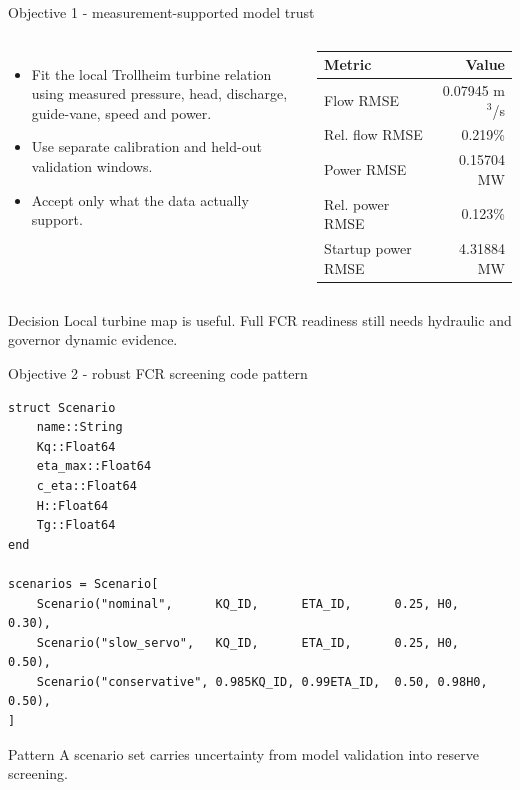 \documentclass[aspectratio=169,11pt]{beamer}
\begin{document}
\begin{frame}{Objective 1 - measurement-supported model trust}
\begin{columns}[T]
\begin{itemize}
\item Fit the local Trollheim turbine relation using measured pressure, head, discharge, guide-vane, speed and power.
\item Use separate calibration and held-out validation windows.
\item Accept only what the data actually support.
\end{itemize}
\begin{table}
\small
\begin{tabular}{lr}
\toprule
Metric & Value\\
\midrule
Flow RMSE & 0.07945 m$^3$/s\\
Rel. flow RMSE & 0.219\%\\
Power RMSE & 0.15704 MW\\
Rel. power RMSE & 0.123\%\\
Startup power RMSE & 4.31884 MW\\
\bottomrule
\end{tabular}
\end{table}
\end{columns}
\begin{block}{Decision}
Local turbine map is useful. Full FCR readiness still needs hydraulic and governor dynamic evidence.
\end{block}
\end{frame}

\begin{frame}[fragile]{Objective 2 - robust FCR screening code pattern}
\begin{lstlisting}
struct Scenario
    name::String
    Kq::Float64
    eta_max::Float64
    c_eta::Float64
    H::Float64
    Tg::Float64
end

scenarios = Scenario[
    Scenario("nominal",      KQ_ID,      ETA_ID,      0.25, H0,     0.30),
    Scenario("slow_servo",   KQ_ID,      ETA_ID,      0.25, H0,     0.50),
    Scenario("conservative", 0.985KQ_ID, 0.99ETA_ID,  0.50, 0.98H0, 0.50),
]
\end{lstlisting}
\begin{block}{Pattern}
A scenario set carries uncertainty from model validation into reserve screening.
\end{block}
\end{frame}
\end{document}
